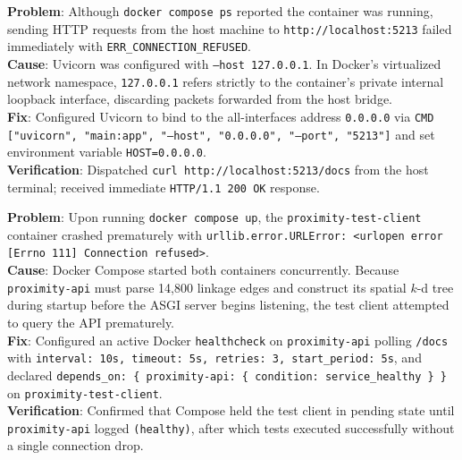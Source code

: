 \documentclass[11pt,a4paper]{article}
\begin{document}
\begin{tcolorbox}[colback=white, colframe=primarycolor!85, boxrule=0.7pt,
                  title={\bfseries Error 2: Container Loopback Interface Binding (\texttt{127.0.0.1})}, fonttitle=\small]
\textbf{Problem}: Although \texttt{docker compose ps} reported the container was running, sending HTTP requests from the host machine to \texttt{http://localhost:5213} failed immediately with \texttt{ERR\_CONNECTION\_REFUSED}.\\
\textbf{Cause}: Uvicorn was configured with \texttt{--host 127.0.0.1}. In Docker's virtualized network namespace, \texttt{127.0.0.1} refers strictly to the container's private internal loopback interface, discarding packets forwarded from the host bridge.\\
\textbf{Fix}: Configured Uvicorn to bind to the all-interfaces address \texttt{0.0.0.0} via \texttt{CMD ["uvicorn", "main:app", "--host", "0.0.0.0", "--port", "5213"]} and set environment variable \texttt{HOST=0.0.0.0}.\\
\textbf{Verification}: Dispatched \texttt{curl http://localhost:5213/docs} from the host terminal; received immediate \texttt{HTTP/1.1 200 OK} response.
\end{tcolorbox}

\begin{tcolorbox}[colback=white, colframe=primarycolor!85, boxrule=0.7pt,
                  title={\bfseries Error 3: Multi-Container Startup Race Condition}, fonttitle=\small]
\textbf{Problem}: Upon running \texttt{docker compose up}, the \texttt{proximity-test-client} container crashed prematurely with \texttt{urllib.error.URLError: <urlopen error [Errno 111] Connection refused>}.\\
\textbf{Cause}: Docker Compose started both containers concurrently. Because \texttt{proximity-api} must parse 14,800 linkage edges and construct its spatial $k$-d tree during startup before the ASGI server begins listening, the test client attempted to query the API prematurely.\\
\textbf{Fix}: Configured an active Docker \texttt{healthcheck} on \texttt{proximity-api} polling \texttt{/docs} with \texttt{interval: 10s, timeout: 5s, retries: 3, start\_period: 5s}, and declared \texttt{depends\_on: \{ proximity-api: \{ condition: service\_healthy \} \}} on \texttt{proximity-test-client}.\\
\textbf{Verification}: Confirmed that Compose held the test client in pending state until \texttt{proximity-api} logged \texttt{(healthy)}, after which tests executed successfully without a single connection drop.
\end{tcolorbox}
\end{document}
